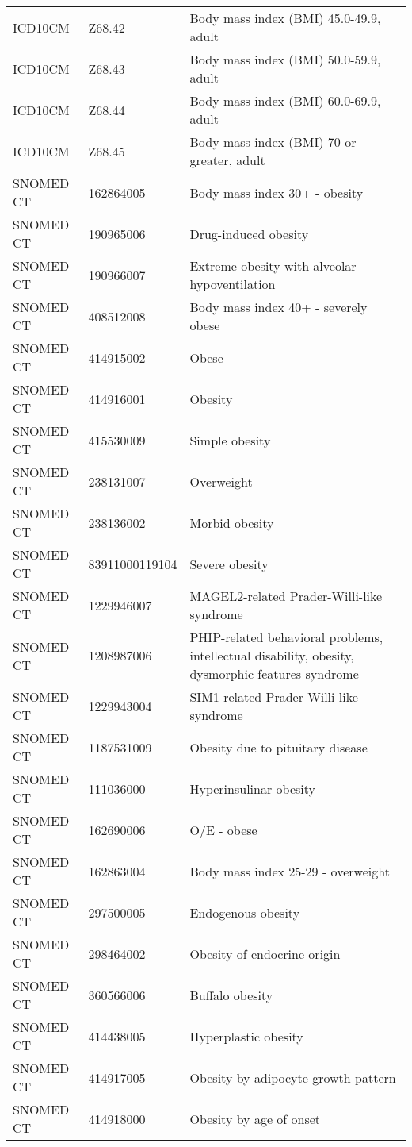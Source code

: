 \begin{longtable}{p{}p{}p{}}
  ICD10CM & Z68.42 & Body mass index (BMI) 45.0-49.9, adult \\ 
  ICD10CM & Z68.43 & Body mass index (BMI) 50.0-59.9, adult \\ 
  ICD10CM & Z68.44 & Body mass index (BMI) 60.0-69.9, adult \\ 
  ICD10CM & Z68.45 & Body mass index (BMI) 70 or greater, adult \\ 
  SNOMED CT & 162864005 & Body mass index 30+ - obesity \\ 
  SNOMED CT & 190965006 & Drug-induced obesity \\ 
  SNOMED CT & 190966007 & Extreme obesity with alveolar hypoventilation \\ 
  SNOMED CT & 408512008 & Body mass index 40+ - severely obese \\ 
  SNOMED CT & 414915002 & Obese \\ 
  SNOMED CT & 414916001 & Obesity \\ 
  SNOMED CT & 415530009 & Simple obesity \\ 
  SNOMED CT & 238131007 & Overweight \\ 
  SNOMED CT & 238136002 & Morbid obesity \\ 
  SNOMED CT & 83911000119104 & Severe obesity \\ 
  SNOMED CT & 1229946007 & MAGEL2-related Prader-Willi-like syndrome \\ 
  SNOMED CT & 1208987006 & PHIP-related behavioral problems, intellectual disability, obesity, dysmorphic features syndrome \\ 
  SNOMED CT & 1229943004 & SIM1-related Prader-Willi-like syndrome \\ 
  SNOMED CT & 1187531009 & Obesity due to pituitary disease \\ 
  SNOMED CT & 111036000 & Hyperinsulinar obesity \\ 
  SNOMED CT & 162690006 & O/E - obese \\ 
  SNOMED CT & 162863004 & Body mass index 25-29 - overweight \\ 
  SNOMED CT & 297500005 & Endogenous obesity \\ 
  SNOMED CT & 298464002 & Obesity of endocrine origin \\ 
  SNOMED CT & 360566006 & Buffalo obesity \\ 
  SNOMED CT & 414438005 & Hyperplastic obesity \\ 
  SNOMED CT & 414917005 & Obesity by adipocyte growth pattern \\ 
  SNOMED CT & 414918000 & Obesity by age of onset \\ 

\end{longtable}
